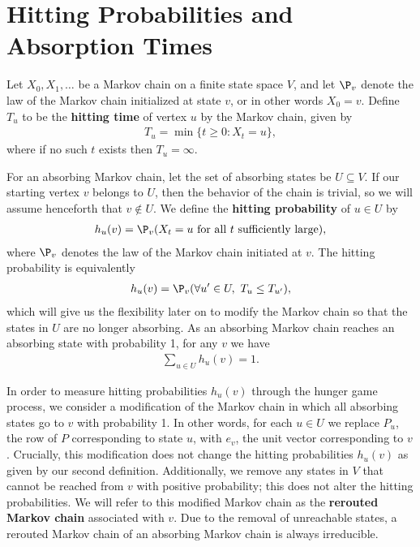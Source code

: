 \section{Hitting Probabilities and Absorption Times}\label{section: hitting probabilities and hitting times}
Let $X_0, X_1, \dots$ be a Markov chain on a finite state space $V$, 
and let $\P_v$ denote the law of the Markov chain initialized at state $v$, 
or in other words $X_0 = v$.
Define $T_u$ to be the \textbf{hitting time} of vertex $u$ by the Markov chain,
given by
\begin{align*}
    T_u = \min\{t \geq 0: X_t = u\},
\end{align*}
where if no such $t$ exists then $T_u = \infty$.

For an absorbing Markov chain, 
let the set of absorbing states be $U \subseteq V$.
If our starting vertex $v$ belongs to $U$, then the behavior of the chain is trivial,
so we will assume henceforth that $v \not\in U$.
We define the \textbf{hitting probability} of $u \in U$ by
\begin{align*}
    h_u(v) = \P_v (\mbox{$X_t = u$ for all $t$ sufficiently large}),
\end{align*}
where $\P_v$ denotes the law of the Markov chain initiated at $v$.
The hitting probability is equivalently
\begin{align*}
    h_u(v) = \P_v (\forall u' \in U,\,\, T_u \leq T_{u'} ),
\end{align*}
which will give us the flexibility later on to modify the Markov chain so that the states in $U$ are no longer absorbing.
As an absorbing Markov chain reaches an absorbing state with probability 1,
for any $v$ we have
\begin{align*}
    \sum_{u \in U} h_u(v) = 1.
\end{align*}

In order to measure hitting probabilities $h_{u}(v)$ 
through the hunger game process, 
we consider a modification of the Markov chain
in which all absorbing states go to $v$ with probability 1.
In other words, for each $u\in U$ we replace $P_u$, the row of $P$ corresponding to state $u$, with $e_v$, the unit vector corresponding to $v$.
Crucially, this modification does not change 
the hitting probabilities $h_{u}(v)$
as given by our second definition.
Additionally, we remove any states in $V$ 
that cannot be reached from $v$ with positive probability;
this does not alter the hitting probabilities.
We will refer to this modified Markov chain as the 
\textbf{rerouted Markov chain} associated with $v$.
Due to the removal of unreachable states, a rerouted Markov chain of an absorbing Markov chain is always irreducible.

